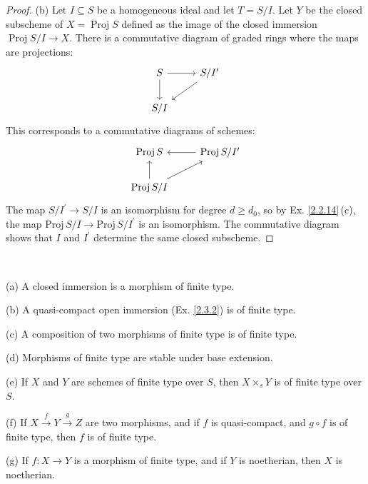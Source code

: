 \begin{proof}
	(b) Let $I \subseteq S$ be a homogeneous ideal and let $T=S / I $. Let $Y$ be the closed subscheme of $X=\operatorname{Proj} S$ defined as the image of the closed immersion $\operatorname{Proj} S / I \rightarrow X $. There is a commutative diagram of graded rings where the maps are projections:
	\begin{equation*}
		\begin{tikzcd}
			S \arrow[d] \arrow[r] & S / I^{\prime} \arrow[ld] \\
			S / I                 &                          
		\end{tikzcd}
	\end{equation*}
	This corresponds to a commutative diagrams of schemes:
	\begin{equation*}
		\begin{tikzcd}
			\operatorname{Proj} S                     & \operatorname{Proj} S / I^{\prime} \arrow[l] \\
			\operatorname{Proj} S / I \arrow[u] \arrow[ru] &                                             
		\end{tikzcd}
	\end{equation*}
	The map $S / I^{\prime} \rightarrow S / I$ is an isomorphism for degree $d \geq d_{0}$, so by Ex. \ref{2.2.14}\,(c), the map $\mathrm{Proj}\,S / I \rightarrow \mathrm{Proj}\, S / I^{\prime}$ is an isomorphism. The commutative diagram shows that $I$ and $I^{\prime}$ determine the same closed subscheme.
\end{proof}
\begin{exe}
	\label{2.3.13}
	\ 
	
	(a) A closed immersion is a morphism of finite type.
	
	(b) A quasi-compact open immersion (Ex. \ref{2.3.2}) is of finite type.
	
	(c) A composition of two morphisms of finite type is of finite type.
	
	(d) Morphisms of finite type are stable under base extension.
	
	(e) If $X$ and $Y$ are schemes of finite type over $S$, then $X \times_{s} Y$ is of finite type over $S$.
	
	(f) If $X \stackrel{f}{\rightarrow} Y \stackrel{g}{\rightarrow} Z$ are two morphisms, and if $f$ is quasi-compact, and $g \circ f$ is of finite type, then $f$ is of finite type.
	
	(g) If $f: X \rightarrow Y$ is a morphism of finite type, and if $Y$ is noetherian, then $X$ is noetherian.
\end{exe}
